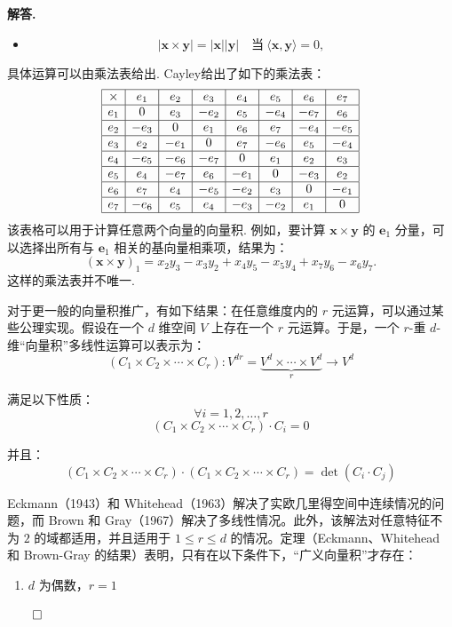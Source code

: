 \documentclass[12pt, a4paper, oneside]{ctexart}
\newenvironment{solution}{\par\noindent\textbf{解答. }}{\hfill$\qed$\par}
\begin{document}
\begin{solution}
\begin{itemize}
			\item 
			\[
			|\bm{x} \times \bm{y}| = |\bm{x}| |\bm{y}| \quad \text{当} \ \langle\bm{x},\bm{y}\rangle = 0,
			\]
		\end{itemize}
		具体运算可以由乘法表给出. Cayley给出了如下的乘法表：
		\[
		\begin{array}{|c|c|c|c|c|c|c|c|}
			\hline
			\times & e_1 & e_2 & e_3 & e_4 & e_5 & e_6 & e_7 \\ \hline
			e_1 & 0 & e_3 & -e_2 & e_5 & -e_4 & -e_7 & e_6 \\ \hline
			e_2 & -e_3 & 0 & e_1 & e_6 & e_7 & -e_4 & -e_5 \\ \hline
			e_3 & e_2 & -e_1 & 0 & e_7 & -e_6 & e_5 & -e_4 \\ \hline
			e_4 & -e_5 & -e_6 & -e_7 & 0 & e_1 & e_2 & e_3 \\ \hline
			e_5 & e_4 & -e_7 & e_6 & -e_1 & 0 & -e_3 & e_2 \\ \hline
			e_6 & e_7 & e_4 & -e_5 & -e_2 & e_3 & 0 & -e_1 \\ \hline
			e_7 & -e_6 & e_5 & e_4 & -e_3 & -e_2 & e_1 & 0 \\ \hline
		\end{array}
		\]
		该表格可以用于计算任意两个向量的向量积. 例如，要计算 $\bm{x} \times \bm{y}$ 的 $\bm{e}_1$ 分量，可以选择出所有与 $\bm{e}_1$ 相关的基向量相乘项，结果为：
		\[
		(\bm{x} \times \bm{y})_1 = x_2 y_3 - x_3 y_2 + x_4 y_5 - x_5 y_4 + x_7 y_6 - x_6 y_7.
		\]这样的乘法表并不唯一.
		
		对于更一般的向量积推广，有如下结果：在任意维度内的 $r$ 元运算，可以通过某些公理实现。假设在一个 $d$ 维空间 $V$ 上存在一个 $r$ 元运算。于是，一个 $r$-重 $d$-维“向量积”多线性运算可以表示为：
		\[
		(C_1 \times C_2 \times \cdots \times C_r): V^{dr} = \underbrace{V^d \times \cdots \times V^d}_{r} \to V^d
		\]
		
		满足以下性质：
		\[
		\forall i = 1, 2, \ldots, r
		\]
		\[
		(C_1 \times C_2 \times \cdots \times C_r) \cdot C_i = 0
		\]
		
		并且：
		\[
		(C_1 \times C_2 \times \cdots \times C_r) \cdot (C_1 \times C_2 \times \cdots \times C_r) = \det(C_i \cdot C_j)
		\]
		
		Eckmann（1943）和 Whitehead（1963）解决了实欧几里得空间中连续情况的问题，而 Brown 和 Gray（1967）解决了多线性情况。此外，该解法对任意特征不为 $2$ 的域都适用，并且适用于 $1 \leq r \leq d$ 的情况。定理（Eckmann、Whitehead 和 Brown-Gray 的结果）表明，只有在以下条件下，“广义向量积”才存在：
		\begin{enumerate}[(1)]
			\item $d$ 为偶数，$r = 1$
			

\end{enumerate}
\end{solution}
\end{document}
